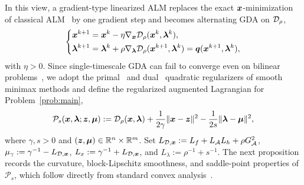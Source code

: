 In this view, a gradient-type linearized
ALM replaces the
exact \(\bm{x}\)-minimization of classical
ALM~\cite{hestenes1969multiplier,powell1969method,rockafellar1973multiplier}
by one gradient step and becomes alternating GDA on
\(\mathcal{D}_\rho\),
\begin{equation}
\left\{
\begin{aligned} 
    \bm{x}^{k+1}
    &=\bm{x}^k-\eta\nabla_{\bm{x}}\mathcal{D}_\rho(\bm{x}^k,\bm{\lambda}^k),\\
    \bm{\lambda}^{k+1}
    &=\bm{\lambda}^k+\rho\nabla_{\bm{\lambda}}\mathcal{D}_\rho(\bm{x}^{k+1},\bm{\lambda}^k)
    =\bm{q}(\bm{x}^{k+1},\bm{\lambda}^k),
\end{aligned} 
\right.
\label{eq:alm-reduced}
\end{equation} 
with \(\eta>0\). Since single-timescale GDA can fail to
converge even on bilinear problems~\cite{daskalakis2018training},
we adopt the primal~\cite{zhang2020smoothed} and
dual~\cite{lu2020hybrid,xu2023unified,zheng2023universal,li2026smoothing}
quadratic regularizers of smooth minimax methods and define the
regularized augmented Lagrangian for Problem~\eqref{prob:main},
\begin{equation}
    \mathcal P_s(\bm{x},\bm{\lambda};\bm{z},\bm{\mu})
    :=\mathcal{D}_\rho(\bm{x},\bm{\lambda})+\frac{1}{2\gamma}\|\bm{x}-\bm{z}\|^2
    -\frac{1}{2s}\|\bm{\lambda}-\bm{\mu}\|^2,
    \label{eq:potential}
\end{equation}
where \(\gamma,s>0\) and \((\bm{z},\bm{\mu})\in\mathbb{R}^n\times\mathbb{R}^m\). Set \(L_{\mathcal{D},\bm{x}}:=L_f+L_{\mathcal{A}}L_h+\rho G_{\mathcal{A}}^{2}\),
\(\mu_\gamma:=\gamma^{-1}-L_{\mathcal{D},\bm{x}}\),
\(L_x:=\gamma^{-1}+L_{\mathcal{D},\bm{x}}\), and \(L_\lambda:=\rho^{-1}+s^{-1}\).
The next proposition records the curvature, block-Lipschitz smoothness, and
saddle-point properties of \(\mathcal P_s\), which follow directly from
standard convex analysis~\cite{rockafellar1970convex}.
